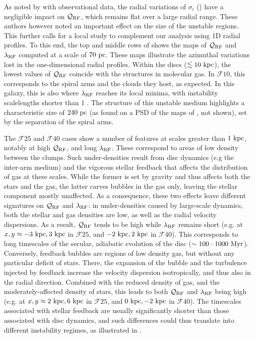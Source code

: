 \documentclass[useAMS,usenatbib]{mnras}
\newcommand{\qrf}{\ensuremath{\mathcal{Q}_{\rm RF}}\xspace}
\newcommand{\lrf}{\ensuremath{\lambda_{\rm RF}}\xspace}
\newcommand{\gs}{\ensuremath{\mathcal{F}10}\xspace}
\newcommand{\gm}{\ensuremath{\mathcal{F}25}\xspace}
\newcommand{\gl}{\ensuremath{\mathcal{F}40}\xspace}
\begin{document}
As noted by \citet{Romeo2017} with observational data, the radial variations of $\sigma_i$ () have a negligible impact on \qrf, which remains flat over a large radial range. These authors however noted an important effect on the size of the unstable regions. This further calls for a local study to complement our analysis using 1D radial profiles. To this end, the top and middle rows of  shows the maps of \qrf and \lrf computed at a scale of $70 \mathrm{~pc}$. These maps illustrate the azimuthal variations lost in the one-dimensional radial profiles. Within the discs ($\lesssim 10 \mathrm{~kpc}$), the lowest values of \qrf coincide with the structures in molecular gas. In \gs, this corresponds to the spiral arms and the clouds they host, as expected. In this galaxy, this is also where \lrf reaches its local minima, with instability scalelengths shorter than 1 \kpc. The structure of this unstable medium highlights a characteristic size of $240 \mathrm{~pc}$ (as found on a PSD of the maps of , not shown), set by the separation of the spiral arms.

The \gm and \gl cases show a number of features at scales greater than $1 \mathrm{~kpc}$, notably at high \qrf, and long \lrf. These correspond to areas of low density between the clumps. Such under-densities result from disc dynamics (e.g the inter-arm medium) and the vigorous stellar feedback that affects the distribution of gas at these scales. While the former is set by gravity and thus affects both the stars and the gas, the latter carves bubbles in the gas only, leaving the stellar component mostly unaffected. As a consequence, these two effects leave different signatures on \qrf and \lrf: in under-densities caused by large-scale dynamics, both the stellar and gas densities are low, as well as the radial velocity dispersions. As a result, \qrf tends to be high while \lrf remains short (e.g. at $x,y \approx -3\mathrm{~kpc}, 3\mathrm{~kpc}$ in \gm, and $-2 \mathrm{~kpc}, 2 \mathrm{~kpc}$ in \gl). This corresponds to long timescales of the secular, adiabatic evolution of the disc ($\sim 100\textrm{\,--\,} 1000 \mathrm{~Myr}$). Conversely, feedback bubbles are regions of low density gas, but without any particular deficit of stars. There, the expansion of the bubble and the turbulence injected by feedback increase the velocity dispersion isotropically, and thus also in the radial direction. Combined with the reduced density of gas, and the moderately-affected density of stars, this leads to both \qrf and \lrf being high (e.g. at $x,y \approx 2\mathrm{~kpc}, 6\mathrm{~kpc}$ in \gm, and $0\mathrm{~kpc}, -2\mathrm{~kpc}$ in \gl). The timescales associated with stellar feedback are usually significantly shorter than those associated with disc dynamics, and such differences could thus translate into different instability regimes, as illustrated in .
\end{document}
